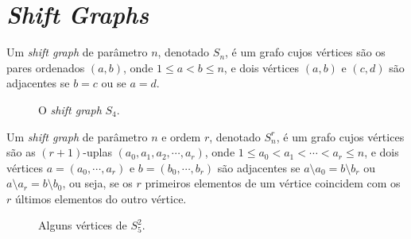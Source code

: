 \chapter{\textit{Shift Graphs}}
\label{cap:shift}

\begin{definicao}
Um \textit{shift graph} de parâmetro $n$, denotado $S_n$, é um grafo cujos vértices são os pares ordenados $(a,b)$, onde $1 \leq a < b \leq n$, e dois vértices $(a,b)$ e $(c,d)$ são adjacentes se $b = c$ ou se $a = d$.
\end{definicao}

\begin{figure}[H]
\centering
{}
\caption{O \textit{shift graph} $S_4$.}
\label{fig:shiftgraph}
\end{figure}

\begin{definicao}
Um \textit{shift graph} de parâmetro $n$ e ordem $r$, denotado $S_n^r$, é um grafo cujos vértices são as $(r+1)$-uplas $(a_0, a_1, a_2, \cdots, a_r)$, onde $1 \leq a_0 < a_1 < \cdots < a_r \leq n$, e dois vértices $a = (a_0, \cdots, a_r)$ e $b = (b_0, \cdots, b_r)$ são adjacentes se $a\setminus a_0 = b\setminus b_r$ ou $a\setminus a_r = b\setminus b_0$, ou seja, se os $r$ primeiros elementos de um vértice coincidem com os $r$ últimos elementos do outro vértice.
\end{definicao}

\begin{figure}[H]
\centering
{}
\caption{Alguns vértices de $S_5^{2}$.}
\label{fig:shiftgraphorder2}
\end{figure}

